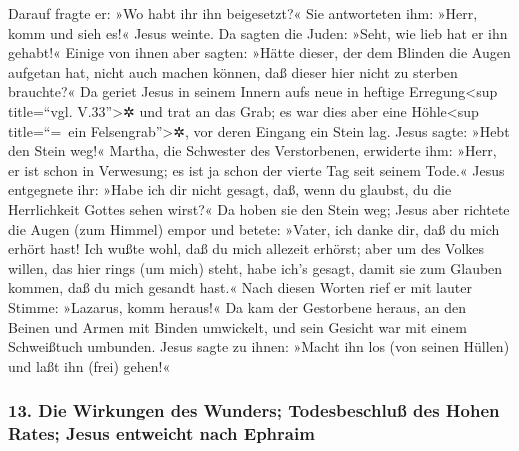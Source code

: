  Darauf fragte er: »Wo habt ihr ihn beigesetzt?« Sie
antworteten ihm: »Herr, komm und sieh es!«  Jesus weinte.
 Da sagten die Juden: »Seht, wie lieb hat er ihn gehabt!«
 Einige von ihnen aber sagten: »Hätte dieser, der dem
Blinden die Augen aufgetan hat, nicht auch machen können, daß dieser
hier nicht zu sterben brauchte?«  Da geriet Jesus in
seinem Innern aufs neue in heftige Erregung\textless sup title=``vgl.
V.33''\textgreater✲ und trat an das Grab; es war dies aber eine
Höhle\textless sup title=``=~ein Felsengrab''\textgreater✲, vor deren
Eingang ein Stein lag.  Jesus sagte: »Hebt den Stein
weg!« Martha, die Schwester des Verstorbenen, erwiderte ihm: »Herr, er
ist schon in Verwesung; es ist ja schon der vierte Tag seit seinem
Tode.«  Jesus entgegnete ihr: »Habe ich dir nicht gesagt,
daß, wenn du glaubst, du die Herrlichkeit Gottes sehen wirst?«
 Da hoben sie den Stein weg; Jesus aber richtete die
Augen (zum Himmel) empor und betete: »Vater, ich danke dir, daß du mich
erhört hast!  Ich wußte wohl, daß du mich allezeit
erhörst; aber um des Volkes willen, das hier rings (um mich) steht, habe
ich's gesagt, damit sie zum Glauben kommen, daß du mich gesandt hast.«
 Nach diesen Worten rief er mit lauter Stimme: »Lazarus,
komm heraus!«  Da kam der Gestorbene heraus, an den
Beinen und Armen mit Binden umwickelt, und sein Gesicht war mit einem
Schweißtuch umbunden. Jesus sagte zu ihnen: »Macht ihn los (von seinen
Hüllen) und laßt ihn (frei) gehen!«

\hypertarget{die-wirkungen-des-wunders-todesbeschluuxdf-des-hohen-rates-jesus-entweicht-nach-ephraim}{%
\subsubsection{13. Die Wirkungen des Wunders; Todesbeschluß des Hohen
Rates; Jesus entweicht nach
Ephraim}\label{die-wirkungen-des-wunders-todesbeschluuxdf-des-hohen-rates-jesus-entweicht-nach-ephraim}}

